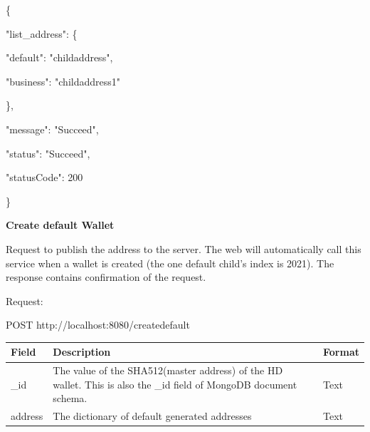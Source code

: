 \begin{framed}
    \hspace*{13mm}        \{\par
    \hspace*{13mm}          "list\_address": \{ \par
    \hspace*{18mm}        "default": "childaddress", \par
    \hspace*{18mm}        "business": "childaddress1"    \par
    \hspace*{18mm}        \},\par
    \hspace*{13mm}                "message": "Succeed",   \par
    \hspace*{13mm}                "status": "Succeed",  \par
    \hspace*{13mm}             "statusCode": 200   \par
    \hspace*{13mm}                 \}    \par

\end{framed}
    
\bigskip
{\textbf{Create default Wallet}}
\bigskip

Request to publish the address to the server. The web will automatically call this service when a wallet is created (the one default child’s index is 2021). The response contains confirmation of the request.

Request:

\begin{framed}
    POST http://localhost:8080/createdefault
\end{framed}

\begin{tabular}{m{3cm}  m{9cm} m{2.6cm} }
    \toprule
    Field & Description & Format                                            \\ 
    \midrule
    \_id & The value of the SHA512(master address) of the HD wallet. This is also the \_id field of MongoDB document schema.  & Text   \\ 
    address   & The dictionary of default generated addresses & Text    \\ 
    \bottomrule
\end{tabular}
\bigskip

